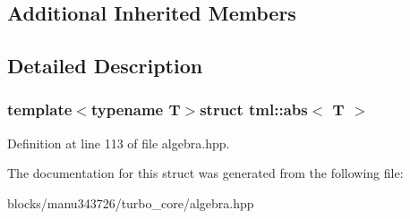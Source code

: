 \subsection*{Additional Inherited Members}


\subsection{Detailed Description}
\subsubsection*{template$<$typename T$>$struct tml\+::abs$<$ T $>$}



Definition at line 113 of file algebra.\+hpp.



The documentation for this struct was generated from the following file\+:\begin{DoxyCompactItemize}
\item 
blocks/manu343726/turbo\+\_\+core/algebra.\+hpp\end{DoxyCompactItemize}
